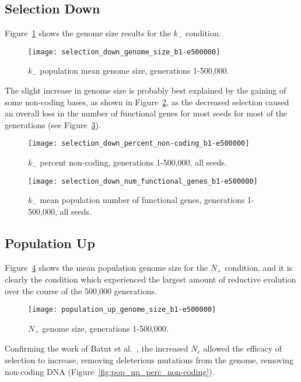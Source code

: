 \subsection{Selection Down}
Figure~\ref{fig:selection_down_genome_size} shows the genome size results for the $k_-$ condition. 
\begin{figure}[H]
	\centering
	\texttt{[image: selection\_down\_genome\_size\_b1-e500000]}
	\caption[Selection down genome size]{$k_-$ population mean genome size, generations 1-500,000.}
	\label{fig:selection_down_genome_size}
\end{figure}
The slight increase in genome size is probably best explained by the gaining of some non-coding bases, as shown in Figure~\ref{fig:selection_down_perc_non-coding}, as the decreased selection caused an overall loss in the number of functional genes for most seeds for most of the generations (see Figure~\ref{fig:selection_down_num_functional_genes}).  
\begin{figure}[H]
	\centering
	\texttt{[image: selection\_down\_percent\_non-coding\_b1-e500000]}
	\caption[Selection down percent non-coding]{$k_-$ percent non-coding, generations 1-500,000, all seeds.}
	\label{fig:selection_down_perc_non-coding}
\end{figure}

\begin{figure}[H]
	\centering
	\texttt{[image: selection\_down\_num\_functional\_genes\_b1-e500000]}
	\caption[Selection down number of functional genes.]{$k_-$ mean population number of functional genes, generations 1-500,000, all seeds.}
	\label{fig:selection_down_num_functional_genes}
\end{figure}


\subsection{Population Up}
Figure~\ref{fig:pop_up_genome_size} shows the mean population genome size for the $N_+$ condition, and it is clearly the condition which experienced the largest amount of reductive evolution over the course of the 500,000 generations. 
\begin{figure}[H]
	\centering
	\texttt{[image: population\_up\_genome\_size\_b1-e500000]}
	\caption[Population up genome size]{$N_+$ genome size, generations 1-500,000.}
	\label{fig:pop_up_genome_size}
\end{figure}

Confirming the work of Batut et al.~\cite{Batut.2014}, the increased $N_e$ allowed the efficacy of selection to increase, removing deleterious mutations from the genome, removing non-coding DNA (Figure~\ref{fig:pop_up_perc_non-coding}). 


